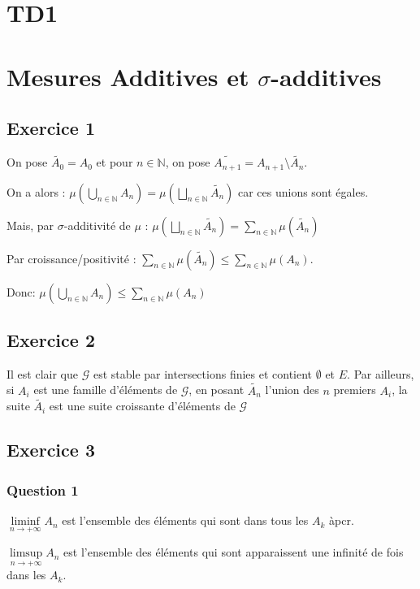 \documentclass{cours}
\begin{document}
\section{TD1}

\section{Mesures Additives et $\sigma$-additives}
\subsection{Exercice 1}
On pose $\tilde{A_{0}} = A_{0}$ et pour $n \in \mathbb{N}$, on pose $\tilde{A_{n+1}} = A_{n+1} \setminus \tilde{A_{n}}$.

On a alors : $\mu \left(\bigcup\limits_{n\in\mathbb{N}}A_{n}\right) = \mu\left(\bigsqcup\limits_{n\in\mathbb{N}}\tilde{A_{n}}\right)$ car ces unions sont égales.

Mais, par $\sigma$-additivité de $\mu$ : $\mu\left(\bigsqcup\limits_{n\in\mathbb{N}}\tilde{A_{n}}\right) = \sum_{n\in \mathbb{N}}\mu\left(\tilde{A_{n}}\right)$

Par croissance/positivité : $\sum_{n\in \mathbb{N}}\mu\left(\tilde{A_{n}}\right) \leq \sum_{n\in \mathbb{N}}\mu\left(A_{n}\right)$.

Donc: $\mu \left(\bigcup\limits_{n\in\mathbb{N}}A_{n}\right)\leq \sum_{n\in \mathbb{N}}\mu\left(A_{n}\right)$

\subsection{Exercice 2}
Il est clair que $\mathcal{G}$ est stable par intersections finies et contient $\emptyset$ et $E$. Par ailleurs, si $A_{i}$ est une famille d'éléments de $\mathcal{G}$, en posant $\tilde{A_{n}}$ l'union des $n$ premiers $A_{i}$, la suite $\tilde{A_{i}}$ est une suite croissante d'éléments de $\mathcal{G}$

\subsection{Exercice 3}
\subsubsection{Question 1}
$\liminf\limits_{n\to +\infty} A_{n}$ est l'ensemble des éléments qui sont dans tous les $A_{k}$ àpcr.

$\limsup\limits_{n\to +\infty} A_{n}$ est l'ensemble des éléments qui sont apparaissent une infinité de fois dans les $A_{k}$.
\end{document}
